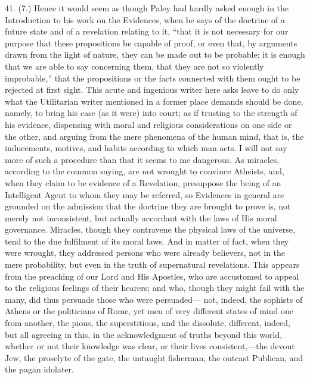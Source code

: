 41. (7.) Hence it would seem as though Paley had hardly asked
enough in the Introduction to his work on the Evidences, when he says
of the doctrine of a future state and of a revelation relating to it,
``that it is not necessary for our purpose that these propositions
be capable of proof, or even that, by arguments drawn from the light
of nature, they can be made out to be probable; it is enough that we
are able to say concerning them, that they are not so violently
improbable,'' that the propositions or the facts connected with
them ought to be rejected at first sight. This acute and ingenious
writer here asks leave to do only what the Utilitarian writer
mentioned in a former place demands should be done, namely, to bring
his case (as it were) into court; as if trusting to the strength of
his evidence, dispensing with moral and religious considerations on
one side or the other, and arguing from the mere phenomena of the
human mind, that is, the inducements, motives, and habits according to
which man acts. I will not say more of such a procedure than that it
seems to me dangerous. As miracles, according to the common saying,
are not wrought to convince Atheists, and, when they claim to be
evidence of a Revelation, presuppose the being of an Intelligent Agent
to whom they may be referred, so Evidences in general are grounded on
the admission that the doctrine they are brought to prove is, not
merely not inconsistent, but actually accordant with the laws of His
moral governance. Miracles, though they contravene the physical laws
of the universe, tend to the due fulfilment of its moral laws. And in
matter of fact, when they were wrought, they addressed persons who
were already believers, not in the mere probability, but even in the
truth of supernatural revelations. This appears from the preaching of
our Lord and His Apostles, who are accustomed to appeal to the
religious feelings of their hearers; and who, though they might fail
with the many, did thus persuade those who were persuaded— not,
indeed, the sophists of Athens or the politicians of Rome, yet men of
very different states of mind one from another, the pious, the
superstitious, and the dissolute, different, indeed, but all agreeing
in this, in the acknowledgment of truths beyond this world, whether or
not their knowledge was clear, or their lives consistent,—the devout
Jew, the proselyte of the gate, the untaught fisherman, the outcast
Publican, and the pagan idolater.

